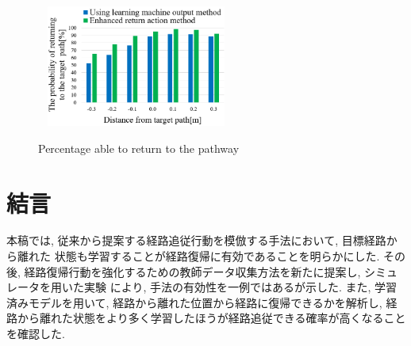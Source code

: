 \documentclass{jarticle}
\begin{document}
\begin{figure}[h!]\
  \centering
   \includegraphics[height=40mm]{./figs/kaiseki2-2.png}
   \caption{Percentage able to return to the pathway}
\end{figure}


\section{結言}
本稿では, 従来から提案する経路追従行動を模倣する手法において, 目標経路から離れた
状態も学習することが経路復帰に有効であることを明らかにした.
その後, 経路復帰行動を強化するための教師データ収集方法を新たに提案し, シミュレータを用いた実験
により, 手法の有効性を一例ではあるが示した.
また, 学習済みモデルを用いて, 経路から離れた位置から経路に復帰できるかを解析し,
経路から離れた状態をより多く学習したほうが経路追従できる確率が高くなることを確認した.
\vspace*{4mm}
\end{document}
